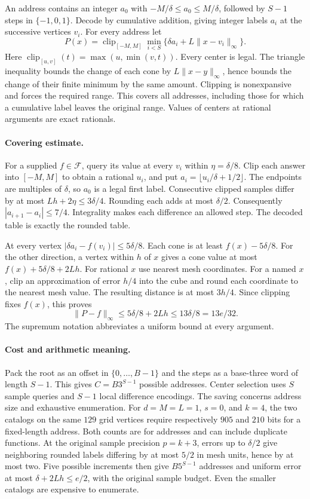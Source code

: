 An address contains an integer $a_0$ with $-M/\delta\le a_0\le M/\delta$, followed by $S-1$ steps in $\{-1,0,1\}$. Decode by cumulative addition, giving integer labels $a_i$ at the successive vertices $v_i$. For every address let
\[
 P(x)=\operatorname{clip}_{[-M,M]}\min_{i<S}
           \{\delta a_i+L\|x-v_i\|_\infty\}.
\]
Here $\operatorname{clip}_{[u,v]}(t)=\max(u,\min(v,t))$. Every center is legal. The triangle inequality bounds the change of each cone by $L\|x-y\|_\infty$, hence bounds the change of their finite minimum by the same amount. Clipping is nonexpansive and forces the required range. This covers all addresses, including those for which a cumulative label leaves the original range. Values of centers at rational arguments are exact rationals.

\paragraph{Covering estimate.}
For a supplied $f\in\mathcal F$, query its value at every $v_i$ within $\eta=\delta/8$. Clip each answer into $[-M,M]$ to obtain a rational $u_i$, and put $a_i=\lfloor u_i/\delta+1/2\rfloor$. The endpoints are multiples of $\delta$, so $a_0$ is a legal first label. Consecutive clipped samples differ by at most $Lh+2\eta\le3\delta/4$. Rounding each adds at most $\delta/2$. Consequently $|a_{i+1}-a_i|\le7/4$. Integrality makes each difference an allowed step. The decoded table is exactly the rounded table.

At every vertex $|\delta a_i-f(v_i)|\le5\delta/8$. Each cone is at least $f(x)-5\delta/8$. For the other direction, a vertex within $h$ of $x$ gives a cone value at most $f(x)+5\delta/8+2Lh$. For rational $x$ use nearest mesh coordinates. For a named $x$, clip an approximation of error $h/4$ into the cube and round each coordinate to the nearest mesh value. The resulting distance is at most $3h/4$. Since clipping fixes $f(x)$, this proves
\[
 \|P-f\|_\infty\le 5\delta/8+2Lh\le13\delta/8=13e/32.
\]
The supremum notation abbreviates a uniform bound at every argument.

\paragraph{Cost and arithmetic meaning.}
Pack the root as an offset in $\{0,\ldots,B-1\}$ and the steps as a base-three word of length $S-1$. This gives $C=B3^{S-1}$ possible addresses. Center selection uses $S$ sample queries and $S-1$ local difference encodings. The saving concerns address size and exhaustive enumeration. For $d=M=L=1$, $s=0$, and $k=4$, the two catalogs on the same $129$ grid vertices require respectively $905$ and $210$ bits for a fixed-length address. Both counts are for addresses and can include duplicate functions. At the original sample precision $p=k+3$, errors up to $\delta/2$ give neighboring rounded labels differing by at most $5/2$ in mesh units, hence by at most two. Five possible increments then give $B5^{S-1}$ addresses and uniform error at most $\delta+2Lh\le e/2$, with the original sample budget. Even the smaller catalogs are expensive to enumerate.

